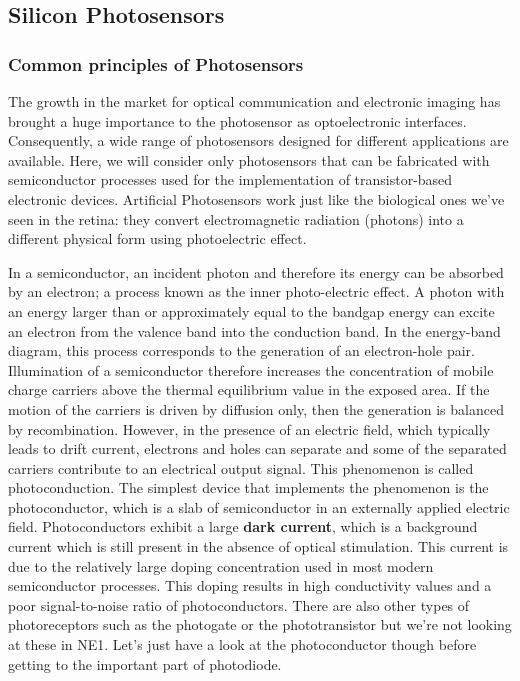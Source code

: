 \subsection{Silicon Photosensors}

\subsubsection{Common principles of Photosensors}

The growth in the market for optical communication and electronic imaging has brought a huge importance to the photosensor as optoelectronic interfaces. Consequently, a wide range of photosensors designed for different applications are available. Here, we will consider only photosensors that can be fabricated with semiconductor processes used for the implementation of transistor-based electronic devices. 
Artificial Photosensors work just like the biological ones we've seen in the retina: they convert electromagnetic radiation (photons) into a different physical form using photoelectric effect. 

In a semiconductor, an incident photon and therefore its energy can be absorbed by an electron; a process known as the inner photo-electric effect. A
photon with an energy larger than or approximately equal to the bandgap energy can excite an electron from the valence band into the conduction band.
In the energy-band diagram, this process corresponds to the generation of an
electron-hole pair. Illumination of a semiconductor therefore increases the concentration of mobile charge carriers above the thermal equilibrium value in
the exposed area. If the motion of the carriers is driven by diffusion only, then the
generation is balanced by recombination. However, in the presence of an electric field, which typically leads to drift current, electrons and holes can separate and some of the separated carriers contribute to an electrical output signal. This phenomenon is called photoconduction. The simplest device that implements the phenomenon is the photoconductor, which is a slab of semiconductor in an externally applied electric
field. Photoconductors exhibit a large \textbf{dark current}, which is a background current which is still present in the absence of optical stimulation. This current is
due to the relatively large doping concentration used in most modern semiconductor processes. This doping results in high conductivity values and a poor signal-to-noise ratio of photoconductors. There are also other types of photoreceptors such as the photogate or the phototransistor but we're not looking at these in NE1. Let's just have a look at the photoconductor though before getting to the important part of photodiode. 

